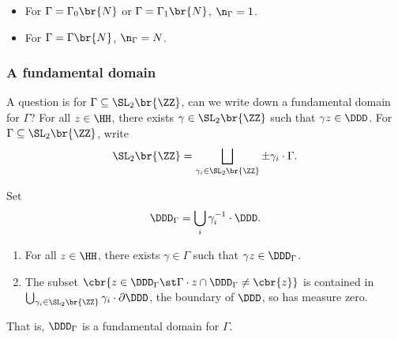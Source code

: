 \begin{example*}
\hfill
\begin{itemize}
\item For $ \Gamma = \Gamma_0\br{N} $ or $ \Gamma = \Gamma_1\br{N} $, $ \n_\Gamma = 1 $.
\item For $ \Gamma = \Gamma\br{N} $, $ \n_\Gamma = N $.
\end{itemize}
\end{example*}

\subsubsection{A fundamental domain}

A question is for $ \Gamma \subseteq \SL_2\br{\ZZ} $, can we write down a fundamental domain for $ \Gamma $? For all $ z \in \HH $, there exists $ \gamma \in \SL_2\br{\ZZ} $ such that $ \gamma z \in \DDD $. For $ \Gamma \subseteq \SL_2\br{\ZZ} $, write
$$ \SL_2\br{\ZZ} = \bigsqcup_{\gamma_i \in \SL_2\br{\ZZ}} \pm\gamma_i \cdot \Gamma. $$

\pagebreak

Set
$$ \DDD_\Gamma = \bigcup_i \gamma_i^{-1} \cdot \DDD. $$

\begin{theorem}
\hfill
\begin{enumerate}
\item For all $ z \in \HH $, there exists $ \gamma \in \Gamma $ such that $ \gamma z \in \DDD_\Gamma $.
\item The subset $ \cbr{z \in \DDD_\Gamma \st \Gamma \cdot z \cap \DDD_\Gamma \ne \cbr{z}} $ is contained in $ \bigcup_{\gamma_i \in \SL_2\br{\ZZ}} \gamma_i \cdot \partial\DDD $, the boundary of $ \DDD $, so has measure zero.
\end{enumerate}
That is, $ \DDD_\Gamma $ is a fundamental domain for $ \Gamma $.
\end{theorem}


